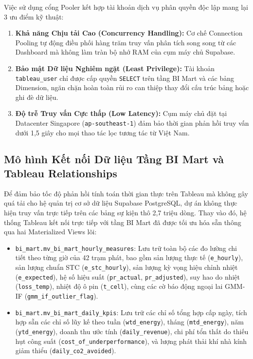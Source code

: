 \documentclass[12pt, a4paper]{report}
\begin{document}
Việc sử dụng cổng Pooler kết hợp tài khoản dịch vụ phân quyền độc lập mang lại 3 ưu điểm kỹ thuật:
\begin{enumerate}[label=\arabic*., leftmargin=*]
    \item \textbf{Khả năng Chịu tải Cao (Concurrency Handling):} Cơ chế Connection Pooling tự động điều phối hàng trăm truy vấn phân tích song song từ các Dashboard mà không làm tràn bộ nhớ RAM của cụm máy chủ Supabase.
    \item \textbf{Bảo mật Dữ liệu Nghiêm ngặt (Least Privilege):} Tài khoản \texttt{tableau\_user} chỉ được cấp quyền \texttt{SELECT} trên tầng BI Mart và các bảng Dimension, ngăn chặn hoàn toàn rủi ro can thiệp thay đổi cấu trúc bảng hoặc ghi đè dữ liệu.
    \item \textbf{Độ trễ Truy vấn Cực thấp (Low Latency):} Cụm máy chủ đặt tại Datacenter Singapore (\texttt{ap-southeast-1}) đảm bảo thời gian phản hồi truy vấn dưới 1,5 giây cho mọi thao tác lọc tương tác từ Việt Nam.
\end{enumerate}

\subsection{Mô hình Kết nối Dữ liệu Tầng BI Mart và Tableau Relationships}
\label{subsec:bi_mart_model}

Để đảm bảo tốc độ phản hồi tính toán thời gian thực trên Tableau mà không gây quá tải cho hệ quản trị cơ sở dữ liệu Supabase PostgreSQL, dự án không thực hiện truy vấn trực tiếp trên các bảng sự kiện thô 2,7 triệu dòng. Thay vào đó, hệ thống Tableau kết nối trực tiếp với tầng BI Mart đã được tối ưu hóa sẵn thông qua hai Materialized Views lõi:
\begin{itemize}
    \item \texttt{bi\_mart.\allowbreak mv\_bi\_mart\_hourly\_measures}: Lưu trữ toàn bộ các đo lường chi tiết theo từng giờ của 42 trạm phát, bao gồm sản lượng thực tế (\texttt{e\_hourly}), sản lượng chuẩn STC (\texttt{e\_stc\_hourly}), sản lượng kỳ vọng hiệu chỉnh nhiệt (\texttt{e\_expected}), hệ số hiệu suất (\texttt{pr\_actual}, \texttt{pr\_adjusted}), suy hao do nhiệt (\texttt{loss\_temp}), nhiệt độ ô pin (\texttt{t\_cell}), cùng các cờ báo động ngoại lai GMM-IF (\texttt{gmm\_if\_outlier\_flag}).
    \item \texttt{bi\_mart.\allowbreak mv\_bi\_mart\_daily\_kpis}: Lưu trữ các chỉ số tổng hợp cấp ngày, tích hợp sẵn các chỉ số lũy kế theo tuần (\texttt{wtd\_energy}), tháng (\texttt{mtd\_energy}), năm (\texttt{ytd\_energy}), doanh thu ước tính (\texttt{daily\_revenue}), chi phí tổn thất do thiếu hụt công suất (\texttt{cost\_of\_underperformance}), và lượng phát thải khí nhà kính giảm thiểu (\texttt{daily\_co2\_avoided}).
\end{itemize}
\end{document}
